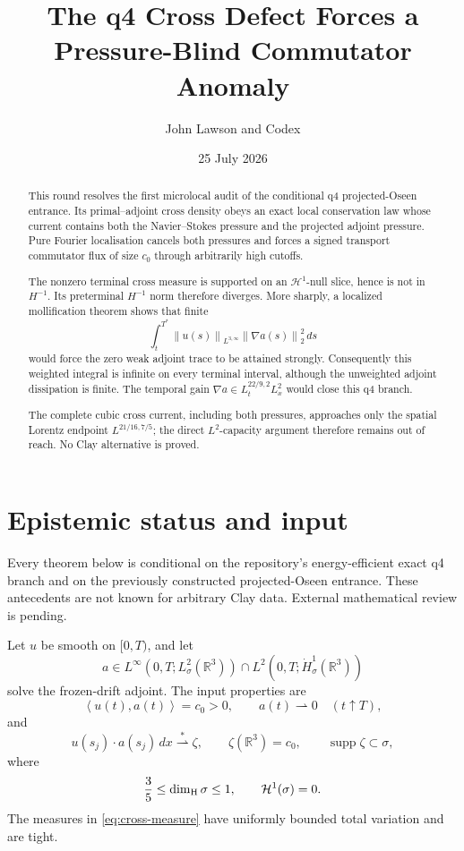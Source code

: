 \documentclass[11pt]{article}
\title{The q4 Cross Defect Forces a Pressure-Blind Commutator Anomaly}
\author{John Lawson and Codex}
\date{25 July 2026}
\theoremstyle{remark}
\newcommand{\R}{\mathbb R}
\newcommand{\ip}[2]{\left\langle #1,#2\right\rangle}
\newcommand{\norm}[1]{\left\|#1\right\|}
\newcommand{\supp}{\operatorname{supp}}
\newcommand{\weakto}{\rightharpoonup}
\newcommand{\HH}{\mathcal H}
\begin{document}
\maketitle

\begin{abstract}
This round resolves the first microlocal audit of the conditional q4
projected-Oseen entrance.  Its primal--adjoint cross density obeys an
exact local conservation law whose current contains both the
Navier--Stokes pressure and the projected adjoint pressure.  Pure Fourier
localisation cancels both pressures and forces a signed transport
commutator flux of size \(c_0\) through arbitrarily high cutoffs.

The nonzero terminal cross measure is supported on an
\(\HH^1\)-null slice, hence is not in \(H^{-1}\).  Its preterminal
\(H^{-1}\) norm therefore diverges.  More sharply, a localized
mollification theorem shows that finite
\[
 \int_t^{T^*}
 \norm{u(s)}_{L^{3,\infty}}\norm{\nabla a(s)}_2^2\,ds
\]
would force the zero weak adjoint trace to be attained strongly.
Consequently this weighted integral is infinite on every terminal
interval, although the unweighted adjoint dissipation is finite.
The temporal gain
\(\nabla a\in L_t^{22/9,2}L_x^2\) would close this q4 branch.

The complete cubic cross current, including both pressures, approaches
only the spatial Lorentz endpoint \(L^{21/16,7/5}\); the direct
\(L^2\)-capacity argument therefore remains out of reach.  No Clay
alternative is proved.
\end{abstract}

\section{Epistemic status and input}

Every theorem below is conditional on the repository's energy-efficient
exact q4 branch and on the previously constructed projected-Oseen
entrance.  These antecedents are not known for arbitrary Clay data.
External mathematical review is pending.

Let \(u\) be smooth on \([0,T)\), and let
\[
 a\in
 L^\infty(0,T;L^2_\sigma(\R^3))
 \cap
 L^2(0,T;\dot H^1_\sigma(\R^3))
\]
solve the frozen-drift adjoint.  The input properties are
\begin{equation}
 \label{eq:pair}
 \ip{u(t)}{a(t)}=c_0>0,
 \qquad
 a(t)\weakto0
 \quad(t\uparrow T),
\end{equation}
and
\begin{equation}
 \label{eq:cross-measure}
 u(s_j)\cdot a(s_j)\,dx
 \overset{*}{\rightharpoonup}\zeta,
 \qquad
 \zeta(\R^3)=c_0,
 \qquad
 \supp\zeta\subset\sigma,
\end{equation}
where
\begin{equation}
 \label{eq:slice}
 \frac35\leq\dim_{\rm H}\sigma\leq1,
 \qquad
 \HH^1(\sigma)=0.
\end{equation}
The measures in \eqref{eq:cross-measure} have uniformly bounded total
variation and are tight.
\end{document}
